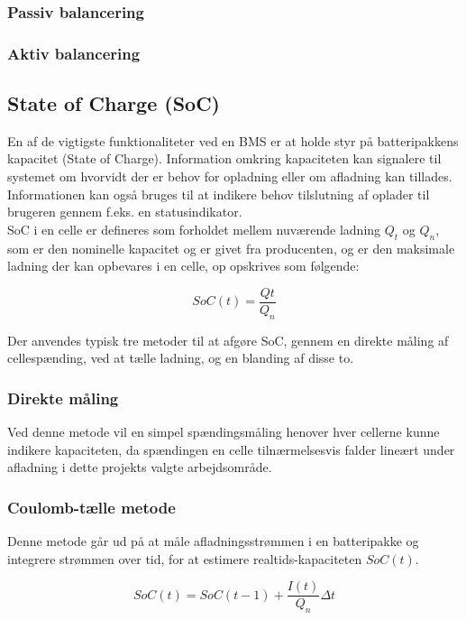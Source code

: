 \subsubsection{Passiv balancering}

\subsubsection{Aktiv balancering}

\subsection{State of Charge (SoC)}
En af de vigtigste funktionaliteter ved en BMS er at holde styr på batteripakkens kapacitet (State of Charge). Information omkring kapaciteten kan signalere til systemet om hvorvidt der er behov for opladning eller om afladning kan tillades. Informationen kan også bruges til at indikere behov tilslutning af oplader til brugeren gennem f.eks. en statusindikator.
\\

SoC i en celle er defineres som forholdet mellem nuværende ladning $Q_{t}$ og $Q_{n}$, som er den nominelle kapacitet og er givet fra producenten, og er den maksimale ladning der kan opbevares i en celle, op opskrives som følgende:

\begin {equation} 
SoC(t) = \frac{Qt}{Q_n} \label{eq:soc}
\end {equation}

Der anvendes typisk tre metoder til at afgøre SoC, gennem en direkte måling af cellespænding, ved at tælle ladning, og en blanding af disse to.

\subsubsection{Direkte måling}
Ved denne metode vil en simpel spændingsmåling henover hver cellerne kunne indikere kapaciteten, da spændingen en celle tilnærmelsesvis falder lineært under afladning i dette projekts valgte arbejdsområde.

\subsubsection{Coulomb-tælle metode}
Denne metode går ud på at måle afladningsstrømmen i en batteripakke og integrere strømmen over tid, for at estimere realtids-kapaciteten $SoC(t)$. 

\begin {equation} 
SoC(t) = SoC(t-1)+\frac{I(t)}{Q_n} \Delta t  \label{eq:coulomb-count}
\end {equation}

